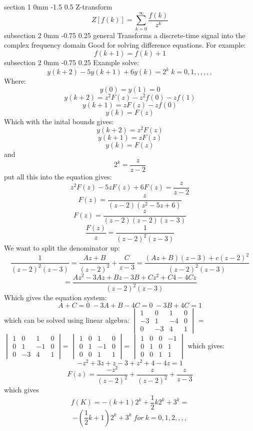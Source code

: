 \documentclass[a4paper,11pt]{article}
\makeatletter
\renewcommand{\section}{\@startsection
   {section}%
   {1}%
   {0mm}%
   {-1.5\baselineskip}%
   {0.5\baselineskip}%
   {\sffamily\bfseries\upshape\normalsize}}%
\renewcommand{\subsection}{\@startsection
   {subsection}%
   {2}%
   {0mm}%
   {-0.75\baselineskip}%
   {0.25\baselineskip}%
   {\rmfamily\normalfont\slshape\normalsize}}%
\makeatother
\begin{document}
\section{Z-transform}
$$Z[f(k)]=\sum_{k=0}^{\infty}\dfrac{f(k)}{z^k}$$
\subsection{general}
Transforms a discrete-time signal into the complex frequency domain
Good for solving difference equations. For example:
$$f(k+1)=f(k)+1$$
\subsection{Example}
solve:
$$y(k+2)-5y(k+1)+6y(k)=2^k\;k=0,1,,,,,,$$
Where:
$$y(0)=y(1)=0$$
$$y(k+2)=z^2F(z)-z^2f(0)-zf(1)$$
$$y(k+1)=zF(z)-zf(0)$$
$$y(k)=F(z)$$
Which with the inital bounds gives:
$$y(k+2)=z^2F(z)$$
$$y(k+1)=zF(z)$$
$$y(k)=F(z)$$
and
$$2^k=\dfrac{z}{z-2}$$
put all this into the equation gives:
$$z^2F(z)-5zF(z)+6F(z)=\dfrac{z}{z-2}$$
$$F(z)=\dfrac{z}{(z-2)(z^2-5z+6)}$$
$$F(z)=\dfrac{z}{(z-2)(z-2)(z-3)}$$
$$\dfrac{F(z)}{z}=\dfrac{1}{(z-2)^2(z-3)}$$
We want to split the denominator up:
$$\dfrac{1}{(z-2)^2(z-3)}=\dfrac{Az+B}{(z-2)^2}+\dfrac{C}{z-3}=\dfrac{(Az+B)(z-3)+c(z-2)^2}{(z-2)^2(z-3)}$$
$$=\dfrac{Az^2-3Az+Bz-3B+Cz^2+C4-4Cz}{(z-2)^2(z-3)}$$
Which gives the equation system:
$$A+C=0 \;-3A+B-4C=0 \; -3B+4C=1$$
which can be solved using linear algebra:\newline
$ \begin{vmatrix} 1&0&1&0\\ -3&1&-4&0\\0&-3&4&1 \end{vmatrix}$
=
$ \begin{vmatrix} 1&0&1&0\\ 0&1&-1&0\\0&-3&4&1 \end{vmatrix}$=
$ \begin{vmatrix} 1&0&1&0\\ 0&1&-1&0\\0&0&1&1 \end{vmatrix}$=
$ \begin{vmatrix} 1&0&0&-1\\ 0&1&0&1\\0&0&1&1 \end{vmatrix}$
which gives:
$$-z^2+3z+z-3+z^2+4-4z=1$$
$$F(z)=\dfrac{-z^2}{(z-2)^2}+\dfrac{z}{(z-2)^2}+\dfrac{z}{z-3}$$
which gives
$$f(K)=-(k+1)2^k+\dfrac{1}{2}k2^k+3^k=$$
$$-(\dfrac{1}{2}k+1)2^k+3^k \; for \: k=0,1,2,,,,$$
\end{document}
